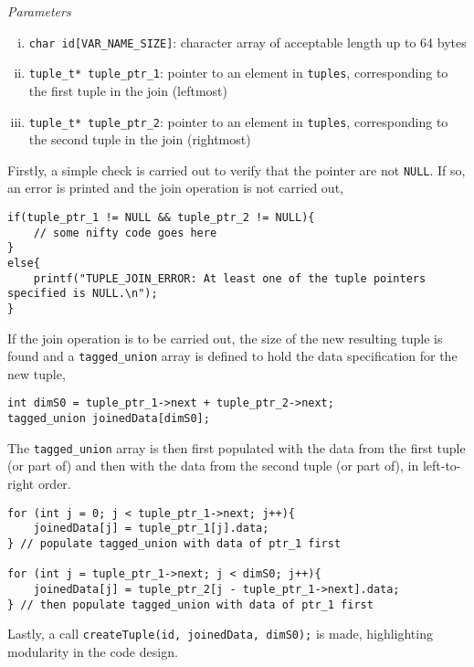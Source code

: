 \documentclass[10pt, a4paper, oneside]{memoir}
\begin{document}
	\textit{Parameters}
	\begin{enumerate}[i.]
		\item \texttt{char id[VAR_NAME_SIZE]}: character array of acceptable length up to 64 bytes
		\item \texttt{tuple_t* tuple_ptr_1}: pointer to an element in \texttt{tuples}, corresponding to the first tuple in the join (leftmost)
		\item \texttt{tuple_t* tuple_ptr_2}: pointer to an element in \texttt{tuples}, corresponding to the second tuple in the join (rightmost)
	\end{enumerate}

	Firstly, a simple check is carried out to verify that the pointer are not \texttt{NULL}. If so, an error is printed and the join operation is not carried out,
\begin{verbatim}
if(tuple_ptr_1 != NULL && tuple_ptr_2 != NULL){
	// some nifty code goes here
}
else{
	printf("TUPLE_JOIN_ERROR: At least one of the tuple pointers specified is NULL.\n");
}
\end{verbatim}

	If the join operation is to be carried out, the size of the new resulting tuple is found and a \texttt{tagged_union} array is defined to hold the data specification for the new tuple,
\begin{verbatim}
int dimS0 = tuple_ptr_1->next + tuple_ptr_2->next;
tagged_union joinedData[dimS0];
\end{verbatim}

	The \texttt{tagged_union} array is then first populated with the data from the first tuple (or part of) and then with the data from the second tuple (or part of), in left-to-right order.
	
\begin{verbatim}
for (int j = 0; j < tuple_ptr_1->next; j++){
	joinedData[j] = tuple_ptr_1[j].data;
} // populate tagged_union with data of ptr_1 first

for (int j = tuple_ptr_1->next; j < dimS0; j++){
	joinedData[j] = tuple_ptr_2[j - tuple_ptr_1->next].data;
} // then populate tagged_union with data of ptr_1 first
\end{verbatim}

	Lastly, a call \texttt{createTuple(id, joinedData, dimS0);} is made, highlighting modularity in the code design.
\end{document}
